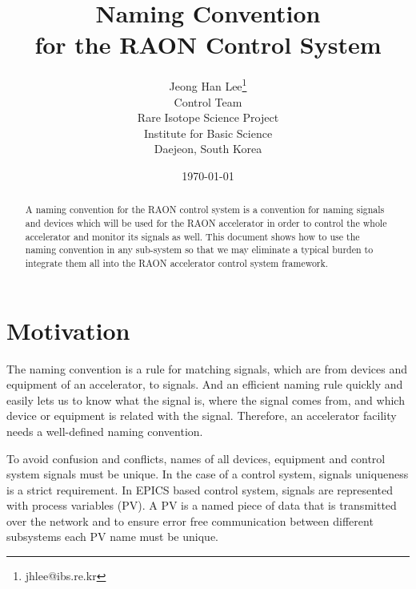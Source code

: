 \documentclass[11pt
  , a4paper
  , article
  , oneside
]{memoir}
\begin{document}
\newcommand{\technumber}{
  RAON Control-Document Series\\
  Revision : v0.1.4,   Release : Oct, 19, 2014}
\title{\textbf{Naming Convention \\ for the RAON Control System}}

\author{Jeong Han Lee\thanks{jhlee@ibs.re.kr} \\
  Control Team \\
  Rare Isotope Science Project\\
  Institute for Basic Science\\
  Daejeon, South Korea
}
\date{\today}

\renewcommand{\maketitlehooka}{\begin{flushright}\textsf{\technumber}\end{flushright}}

\maketitle

\begin{abstract}
A naming convention for the RAON control system is a convention for naming signals and devices which will be used for the RAON accelerator in order to control the whole accelerator and monitor its signals as well. This document shows how to use the naming convention in any sub-system so that we may eliminate a typical burden to integrate them all into the RAON accelerator control system framework. 
\end{abstract}



\chapter{Motivation}
The naming convention is a rule for matching signals, which are from devices and equipment of an accelerator, to signals. And an efficient naming rule quickly and easily lets us to know what the signal is, where the signal comes from, and which device or equipment is related with the signal. Therefore, an accelerator facility needs a well-defined naming convention.  

To avoid confusion and conflicts, names of all devices, equipment and control system signals must be unique. In the case of a control system, signals uniqueness is a strict requirement. In EPICS based control system, signals are represented with process variables (PV). A PV is a named piece of data that is transmitted over the network and to ensure error free communication between different subsystems each PV name must be unique. 
\end{document}
